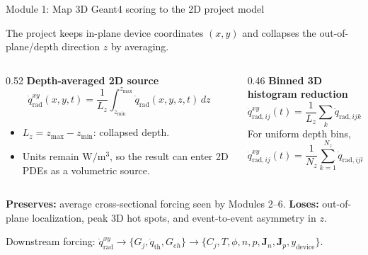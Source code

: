 \documentclass[aspectratio=169,10pt]{beamer}
\begin{document}
\begin{frame}{Module 1: Map 3D Geant4 scoring to the 2D project model}
\small
\vspace{-2mm}
\begin{bluebox}
\centering\small
The project keeps in-plane device coordinates \((x,y)\) and collapses the out-of-plane/depth direction \(z\) by averaging.
\end{bluebox}

\vspace{1mm}
\begin{columns}[T,totalwidth=\textwidth]
\begin{column}{0.52\textwidth}
\textbf{Depth-averaged 2D source}
\begin{equation*}
\boxed{
\dot{q}_{\mathrm{rad}}^{xy}(x,y,t)
=\frac{1}{L_z}\int_{z_{\min}}^{z_{\max}}
\dot{q}_{\mathrm{rad}}(x,y,z,t)\,dz}
\end{equation*}
\small
\begin{itemize}\setlength\itemsep{0.5mm}
\item \(L_z=z_{\max}-z_{\min}\): collapsed depth.
\item Units remain \(\mathrm{W/m^3}\), so the result can enter 2D PDEs as a volumetric source.
\end{itemize}
\end{column}

\begin{column}{0.46\textwidth}
\textbf{Binned 3D histogram reduction}
\begin{equation*}
\boxed{
\dot{q}_{\mathrm{rad},ij}^{xy}(t)
=\frac{1}{L_z}\sum_k\dot{q}_{\mathrm{rad},ijk}(t)\Delta z_k}
\end{equation*}
\small
For uniform depth bins,
\begin{equation*}
\boxed{
\dot{q}_{\mathrm{rad},ij}^{xy}(t)
=\frac{1}{N_z}\sum_{k=1}^{N_z}\dot{q}_{\mathrm{rad},ijk}(t)}
\end{equation*}
\end{column}
\end{columns}

\vspace{1mm}
\begin{greenbox}
\small
\textbf{Preserves:} average cross-sectional forcing seen by Modules 2--6.\quad
\textbf{Loses:} out-of-plane localization, peak 3D hot spots, and event-to-event asymmetry in \(z\).
\end{greenbox}

\vspace{1mm}
\begin{orangebox}
\centering\small
Downstream forcing: \(\dot{q}_{\mathrm{rad}}^{xy}\rightarrow\{G_j,\dot{q}_{\mathrm{th}},G_{eh}\}\rightarrow\{C_j,T,\phi,n,p,\bm J_n,\bm J_p,y_{\mathrm{device}}\}\).
\end{orangebox}
\end{frame}
\end{document}
